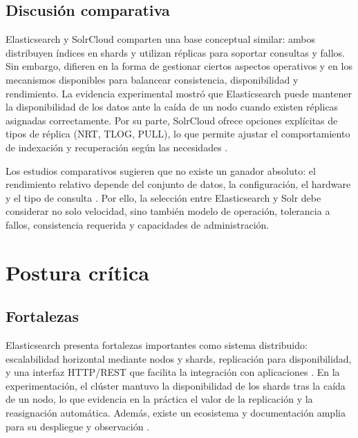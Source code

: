 \documentclass[12pt,a4paper]{article}
\begin{document}
\subsection{Discusión comparativa}
Elasticsearch y SolrCloud comparten una base conceptual similar: ambos distribuyen índices en shards y utilizan réplicas para soportar consultas y fallos. Sin embargo, difieren en la forma de gestionar ciertos aspectos operativos y en los mecanismos disponibles para balancear consistencia, disponibilidad y rendimiento. La evidencia experimental mostró que Elasticsearch puede mantener la disponibilidad de los datos ante la caída de un nodo cuando existen réplicas asignadas correctamente. Por su parte, SolrCloud ofrece opciones explícitas de tipos de réplica (NRT, TLOG, PULL), lo que permite ajustar el comportamiento de indexación y recuperación según las necesidades \cite{solr_shards_indexing,solr_recoveries}.

Los estudios comparativos sugieren que no existe un ganador absoluto: el rendimiento relativo depende del conjunto de datos, la configuración, el hardware y el tipo de consulta \cite{deniz-2023,feraru-2026}. Por ello, la selección entre Elasticsearch y Solr debe considerar no solo velocidad, sino también modelo de operación, tolerancia a fallos, consistencia requerida y capacidades de administración.

\section{Postura crítica}

\subsection{Fortalezas}
Elasticsearch presenta fortalezas importantes como sistema distribuido: escalabilidad horizontal mediante nodos y shards, replicación para disponibilidad, y una interfaz HTTP/REST que facilita la integración con aplicaciones \cite{elastic_distributed_architecture,elastic_nodes_shards,elastic_read_write}. En la experimentación, el clúster mantuvo la disponibilidad de los shards tras la caída de un nodo, lo que evidencia en la práctica el valor de la replicación y la reasignación automática. Además, existe un ecosistema y documentación amplia para su despliegue y observación \cite{calderon-2023,elastic_resilience}.
\end{document}
